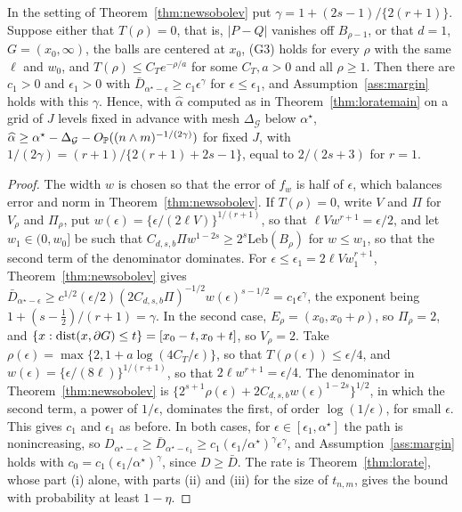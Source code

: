 \begin{corollary}
\label{cor:newsobolev}
In the setting of Theorem~\ref{thm:newsobolev} put $\gamma=1+(2s-1)/\{2(r+1)\}$. Suppose either that $T(\rho)=0$, that
is, $|P-Q|$ vanishes off $B_{\rho-1}$, or that $d=1$, $G=(x_0,\infty)$, the balls are centered at $x_0$, (G3) holds for
every $\rho$ with the same $\ell$ and $w_0$, and $T(\rho)\le C_Te^{-\rho/a}$ for some $C_T,a>0$ and all $\rho\ge1$. Then there
are $c_1>0$ and $\epsilon_1>0$ with $\bar D_{\alpha^\star-\epsilon}\ge c_1\epsilon^\gamma$ for $\epsilon\le\epsilon_1$, and
Assumption~\ref{ass:margin} holds with this $\gamma$. Hence, with $\widehat\alpha$ computed as in
Theorem~\ref{thm:loratemain} on a grid of $J$ levels fixed in advance with mesh $\Delta_{\mathcal G}$ below
$\alpha^\star$, $\widehat\alpha\ge\alpha^\star-\Delta_{\mathcal G}-O_{\mathbb{P}}((n\wedge m)^{-1/(2\gamma)})$
for fixed $J$, with $1/(2\gamma)=(r+1)/\{2(r+1)+2s-1\}$, equal to $2/(2s+3)$ for $r=1$.
\end{corollary}

\begin{proof}
The width $w$ is chosen so that the error of $f_w$ is half of $\epsilon$, which balances error and norm in
Theorem~\ref{thm:newsobolev}. If $T(\rho)=0$, write $V$ and $\Pi$ for $V_\rho$ and $\Pi_\rho$, put
$w(\epsilon)=\{\epsilon/(2\ell V)\}^{1/(r+1)}$, so that $\ell Vw^{r+1}=\epsilon/2$, and let $w_1\in(0,w_0]$ be such that
$C_{d,s,b}\Pi w^{1-2s}\ge2^s\mathrm{Leb}(B_\rho)$ for $w\le w_1$, so that the second term of the denominator dominates. For
$\epsilon\le\epsilon_1=2\ell Vw_1^{r+1}$, Theorem~\ref{thm:newsobolev} gives
$\bar D_{\alpha^\star-\epsilon}\ge c^{1/2}(\epsilon/2)(2C_{d,s,b}\Pi)^{-1/2}w(\epsilon)^{s-1/2}=c_1\epsilon^\gamma$, the exponent being $1+(s-\tfrac12)/(r+1)=\gamma$. In the second case,
$E_\rho=(x_0,x_0+\rho)$, so $\Pi_\rho=2$, and $\{x:\operatorname{dist}(x,\partial G)\le t\}=[x_0-t,x_0+t]$, so $V_\rho=2$. Take
$\rho(\epsilon)=\max\{2,1+a\log(4C_T/\epsilon)\}$, so that $T(\rho(\epsilon))\le\epsilon/4$, and $w(\epsilon)=\{\epsilon/(8\ell)\}^{1/(r+1)}$, so
that $2\ell w^{r+1}=\epsilon/4$. The denominator in Theorem~\ref{thm:newsobolev} is
$\{2^{s+1}\rho(\epsilon)+2C_{d,s,b}w(\epsilon)^{1-2s}\}^{1/2}$, in which the second term, a power of $1/\epsilon$, dominates the
first, of order $\log(1/\epsilon)$, for small $\epsilon$. This gives $c_1$ and $\epsilon_1$ as before. In both cases, for
$\epsilon\in[\epsilon_1,\alpha^\star]$ the path is nonincreasing, so $D_{\alpha^\star-\epsilon}\ge \bar D_{\alpha^\star-\epsilon_1}\ge
c_1(\epsilon_1/\alpha^\star)^\gamma\epsilon^\gamma$, and Assumption~\ref{ass:margin} holds with $c_0=c_1(\epsilon_1/\alpha^\star)^\gamma$, since
$D\ge \bar D$. The rate is Theorem~\ref{thm:lorate}, whose part (i) alone, with parts (ii) and (iii) for the size of
$t_{n,m}$, gives the bound with probability at least $1-\eta$.
\end{proof}

